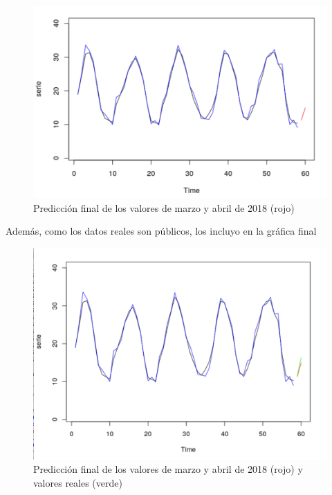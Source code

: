 \begin{figure}[H] %
	\centering
	\includegraphics[scale=0.31]{prediccion-mensual.png}  %
	\caption{Predicción final de los valores de marzo y abril de 2018 (rojo)} 
	\label{fig:predf}
\end{figure}

Además, como los datos reales son públicos, los incluyo en la gráfica final

\begin{figure}[H] %
	\centering
	\includegraphics[scale=0.3]{prediccion-mensual-final.png}  %
	\caption{Predicción final de los valores de marzo y abril de 2018 (rojo) y valores reales (verde)} 
	\label{fig:predmf}
\end{figure}

